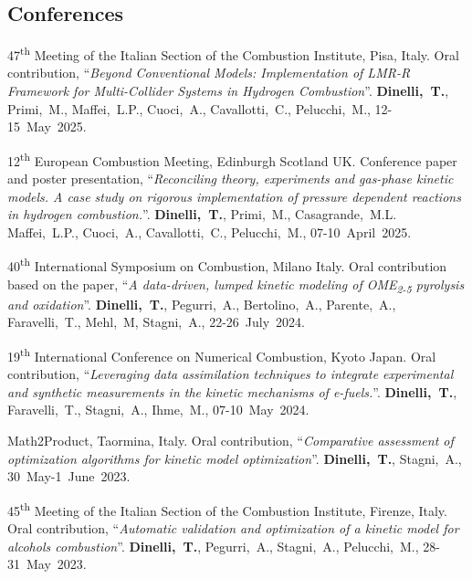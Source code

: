 \subsection{Conferences}
\begin{etaremune}
    \item
    47\textsuperscript{th} Meeting of the Italian Section of the Combustion Institute,
    Pisa, Italy. Oral contribution, ``{\it Beyond Conventional Models: Implementation of
    LMR-R Framework for Multi-Collider Systems in Hydrogen Combustion}''. {\bf
    Dinelli,~T.}, Primi,~M., Maffei,~L.P., Cuoci,~A., Cavallotti,~C., Pelucchi,~M.,
    12-15~May~2025.

    \item
    12\textsuperscript{th} European Combustion Meeting, Edinburgh Scotland UK. Conference
    paper and poster presentation, ``{\it Reconciling theory, experiments and gas-phase
    kinetic models. A case study on rigorous implementation of pressure dependent
    reactions in hydrogen combustion.}''. {\bf Dinelli,~T.}, Primi,~M., Casagrande,~M.L.
    Maffei,~L.P., Cuoci,~A., Cavallotti,~C., Pelucchi,~M.,
    07-10~April~2025.

    \item
    40\textsuperscript{th} International Symposium on Combustion, Milano Italy. Oral
    contribution based on the paper, ``{\it A data-driven, lumped kinetic modeling of
    OME\textsubscript{2-5} pyrolysis and oxidation}''. {\bf Dinelli,~T.},
    Pegurri,~A., Bertolino,~A., Parente,~A., Faravelli,~T., Mehl,~M, Stagni,~A.,
    22-26~July~2024.

    \item
    19\textsuperscript{th} International Conference on Numerical Combustion, Kyoto
    Japan. Oral contribution, ``{\it Leveraging data assimilation techniques to
    integrate experimental and synthetic measurements in the kinetic mechanisms of
    e-fuels.}''. {\bf Dinelli,~T.}, Faravelli,~T., Stagni,~A., Ihme,~M.,
    07-10~May~2024.

    \item
    Math2Product, Taormina, Italy. Oral contribution, ``{\it Comparative
    assessment of optimization algorithms for kinetic model optimization}''.
    {\bf Dinelli,~T.}, Stagni,~A.,
    30~May-1~June~2023.

    \item
    45\textsuperscript{th} Meeting of the Italian Section of the Combustion Institute,
    Firenze, Italy. Oral contribution, ``{\it Automatic validation and optimization
    of a kinetic model for alcohols combustion}''. {\bf Dinelli,~T.},
    Pegurri,~A., Stagni,~A., Pelucchi,~M.,
    28-31~May~2023.


\end{etaremune}
